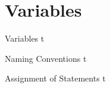 \documentclass[../lecture2-variablesandcontrolstructures.tex]{subfiles}
\begin{document}
\section{Variables}


\begin{frame}[fragile]{Variables}
t
\end{frame}


\begin{frame}[fragile]{Naming Conventions}
t
\end{frame}


\begin{frame}[fragile]{Assignment of Statements}
t
\end{frame}

\end{document}
